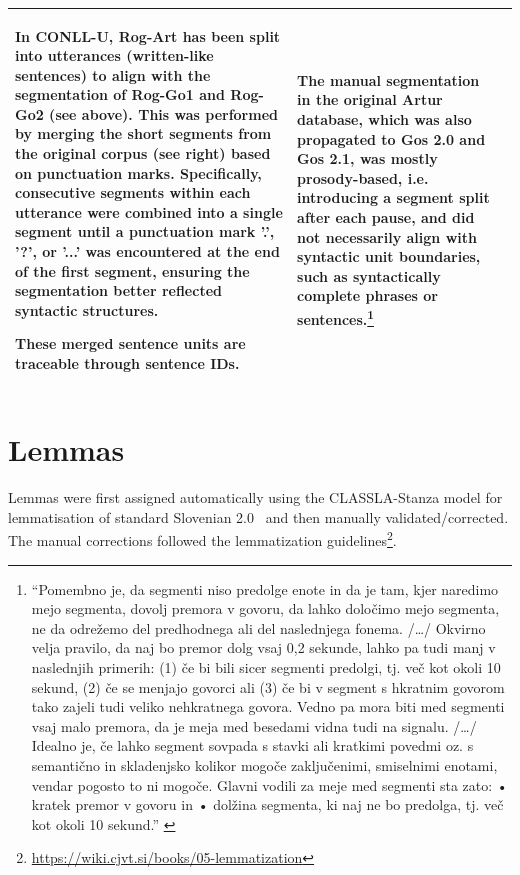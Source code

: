 \documentclass[a4paper,oneside,12pt]{article}
\begin{document}
\begin{minipage}{\linewidth}
\begin{center}
\begin{tabular}{|p{3cm}|p{7cm}|p{7cm}|}
      In CONLL-U, Rog-Art has been split into utterances (written-like
      sentences) to align with the segmentation of Rog-Go1 and Rog-Go2 (see
      above). This was performed by merging the short segments from the original
      corpus (see right) based on punctuation marks. Specifically, consecutive
      segments within each utterance were combined into a single segment until a
      punctuation mark '.', '?', or '...' was encountered at the end of the
      first segment, ensuring the segmentation better reflected syntactic
      structures.

      These merged sentence units are traceable through sentence IDs.
                                                                                                    & The manual segmentation in the original Artur database, which was also
      propagated to Gos 2.0 and Gos 2.1, was mostly prosody-based, i.e.
      introducing a segment split after each pause, and did not necessarily
      align with syntactic unit boundaries, such as syntactically complete
      phrases or sentences.\footnote{``Pomembno je, da segmenti niso predolge
        enote in da je tam, kjer naredimo mejo segmenta, dovolj premora v govoru,
        da lahko določimo mejo segmenta, ne da odrežemo del predhodnega ali del
        naslednjega fonema. /…/ Okvirno velja pravilo, da naj bo premor dolg vsaj
        0,2 sekunde, lahko pa tudi manj v naslednjih primerih: (1) če bi bili
        sicer segmenti predolgi, tj. več kot okoli 10 sekund, (2) če se menjajo
        govorci ali (3) če bi v segment s hkratnim govorom tako zajeli tudi veliko
        nehkratnega govora. Vedno pa mora biti med segmenti vsaj malo premora, da
        je meja med besedami vidna tudi na signalu. /…/ Idealno je, če lahko
        segment sovpada s stavki ali kratkimi povedmi oz. s semantično in
        skladenjsko kolikor mogoče zaključenimi, smiselnimi enotami, vendar
        pogosto to ni mogoče. Glavni vodili za meje med segmenti sta zato: •
        kratek premor v govoru in • dolžina segmenta, ki naj ne bo predolga, tj.
        več kot okoli 10 sekund.''
        \cite{verdonikbizjak2023}
      }

      \\ \hline
    \end{tabular}
  \end{center}
\end{minipage}


\section{Lemmas}
Lemmas were first assigned automatically using the CLASSLA-Stanza model for
lemmatisation of standard Slovenian 2.0~\cite{tercon2023} and then manually
validated/corrected. The manual corrections followed the lemmatization
guidelines\footnote{\url{https://wiki.cjvt.si/books/05-lemmatization}}.
\end{document}
